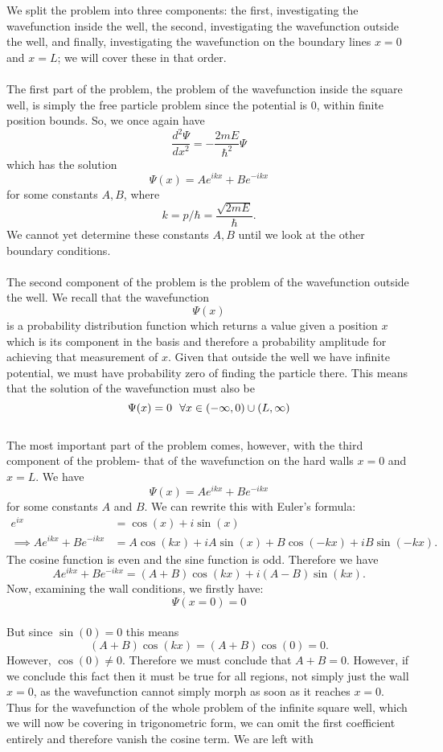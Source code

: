 \\\\
We split the problem into three components: the first, investigating the wavefunction inside the well, the second, investigating the wavefunction outside the well, and finally, investigating the wavefunction on the boundary lines $x=0$ and $x=L$; we will cover these in that order.
\\\\
The first part of the problem, the problem of the wavefunction inside the square well, is simply the free particle problem since the potential is $0$, within finite position bounds. So, we once again have
$$
\frac{d^2\Psi}{dx^2} = -{\frac{2mE}{\hbar^2}}\Psi
$$
which has the solution
$$
\Psi(x)=Ae^{ikx}+Be^{-ikx}
$$
for some constants $A,B$, where 
$$
k=p/\hbar=\frac{\sqrt{2mE}}{\hbar}.
$$
We cannot yet determine these constants $A,B$ until we look at the other boundary conditions.
\\\\
The second component of the problem is the problem of the wavefunction outside the well. We recall that the wavefunction
$$
\Psi(x)
$$
is a probability distribution function which returns a value given a position $x$ which is its component in the basis and therefore a probability amplitude for achieving that measurement of $x$. Given that outside the well we have infinite potential, we must have probability zero of finding the particle there. This means that the solution of the wavefunction must also be 
$$
\Psi(x)=0 \:\:\: \forall x\in(-\infty,0)\cup(L,\infty)
$$
\\
The most important part of the problem comes, however, with the third component of the problem- that of the wavefunction on the hard walls $x=0$ and $x=L$. We have
$$
\Psi(x) = Ae^{ikx}+Be^{-ikx}
$$
for some constants $A$ and $B$. We can rewrite this with Euler's formula:
$$
\begin{aligned}
e^{ix}&=\cos(x)+i\sin(x)\\
\implies Ae^{ikx}+Be^{-ikx}&=A\cos(kx)+iA\sin(x)+B\cos(-kx)+iB\sin(-kx).
\end{aligned}
$$
The cosine function is even and the sine function is odd. Therefore we have 
$$
Ae^{ikx}+Be^{-ikx}=(A+B)\cos(kx)+i(A-B)\sin(kx).
$$
Now, examining the wall conditions, we firstly have:
$$
\Psi(x=0) = 0 
$$
\\
But since $\sin(0)=0$ this means 
$$
(A+B)\cos(kx)=(A+B)\cos(0)=0.
$$ 
However, $\cos(0) \neq 0 $. Therefore we must conclude that $A+B=0$. However, if we conclude this fact then it must be true for all regions, not simply just the wall $x=0$, as the wavefunction cannot simply morph as soon as it reaches $x=0$. Thus for the wavefunction of the whole problem of the infinite square well, which we will now be covering in trigonometric form, we can omit the first coefficient entirely and therefore vanish the cosine term. We are left with
